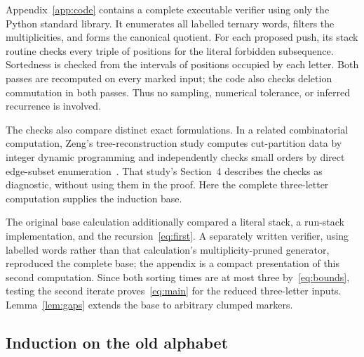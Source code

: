 \documentclass[11pt,a4paper]{article}
\begin{document}
Appendix~\ref{app:code} contains a complete executable verifier using only
the Python standard library. It enumerates all labelled ternary words,
filters the multiplicities, and forms the canonical quotient. For each
proposed push, its stack routine checks every triple of positions for the
literal forbidden subsequence. Sortedness is checked from the intervals of
positions occupied by each letter. Both passes are recomputed on every
marked input; the code also checks deletion commutation in both passes.
Thus no sampling, numerical tolerance, or inferred recurrence is involved.

The checks also compare distinct exact formulations. In a related
combinatorial computation, Zeng's tree-reconstruction study computes
cut-partition data by integer dynamic programming and independently checks
small orders by direct edge-subset enumeration~\cite{Zeng2026MultiplicityArxiv}.
That study's Section~4 describes the checks as diagnostic, without using
them in the proof. Here the complete three-letter computation supplies
the induction base.

The original base calculation additionally compared a literal stack, a
run-stack implementation, and the recursion~\eqref{eq:first}. A separately
written verifier, using labelled words rather than that calculation's
multiplicity-pruned generator, reproduced the complete base; the appendix
is a compact presentation of this second computation. Since both sorting
times are at most three by~\eqref{eq:bounds}, testing the second iterate
proves~\eqref{eq:main} for the reduced three-letter inputs.
Lemma~\ref{lem:gaps} extends the base to arbitrary clumped markers.

\subsection*{Induction on the old alphabet}
\end{document}
